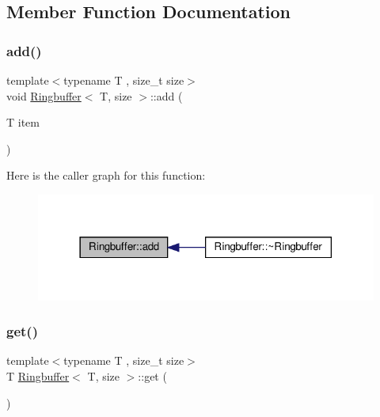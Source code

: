 \subsection{Member Function Documentation}
\mbox{\label{classRingbuffer_a88b2aac3e48efb366d16a10746da3420}} 
\subsubsection{\texorpdfstring{add()}{add()}}
{\footnotesize\ttfamily template$<$typename T , size\+\_\+t size$>$ \\
void \hyperlink{classRingbuffer}{Ringbuffer}$<$ T, size $>$\+::add (\begin{DoxyParamCaption}\item[{T}]{item }\end{DoxyParamCaption})}

Here is the caller graph for this function\+:
\nopagebreak
\begin{figure}[H]
\begin{center}
\leavevmode
\includegraphics[width=318pt]{classRingbuffer_a88b2aac3e48efb366d16a10746da3420_icgraph}
\end{center}
\end{figure}
\mbox{\label{classRingbuffer_a21f95bebbc300f7b7287284ff5a9ea86}} 
\subsubsection{\texorpdfstring{get()}{get()}}
{\footnotesize\ttfamily template$<$typename T , size\+\_\+t size$>$ \\
T \hyperlink{classRingbuffer}{Ringbuffer}$<$ T, size $>$\+::get (\begin{DoxyParamCaption}{ }\end{DoxyParamCaption})}

\mbox{\label{classRingbuffer_a2ebb965f90ff6a14f184619ef3dfeca6}} 
